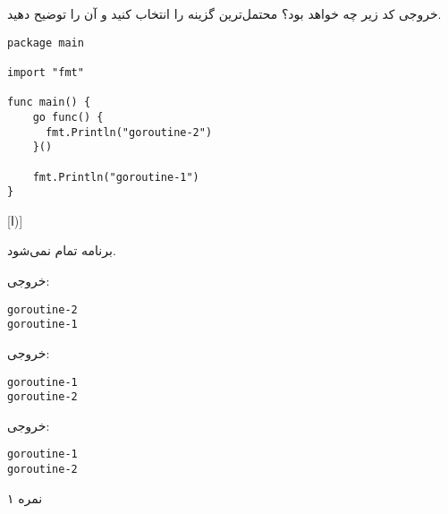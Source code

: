 
خروجی کد زیر چه خواهد بود؟ محتمل‌ترین گزینه را انتخاب کنید و آن را توضیح دهید.

\begin{latin}
\begin{verbatim}
package main

import "fmt"

func main() {
    go func() {
      fmt.Println("goroutine-2")
    }()

    fmt.Println("goroutine-1")
}
\end{verbatim}
\end{latin}

[ا)]

 برنامه تمام نمی‌شود.

 خروجی:

\begin{latin}
\begin{verbatim}
goroutine-2
goroutine-1
\end{verbatim}
\end{latin}

 خروجی:

\begin{latin}
\begin{verbatim}
goroutine-1
goroutine-2
\end{verbatim}
\end{latin}

 خروجی:

\begin{latin}
\begin{verbatim}
goroutine-1
goroutine-2
\end{verbatim}
\end{latin}


۱ نمره

